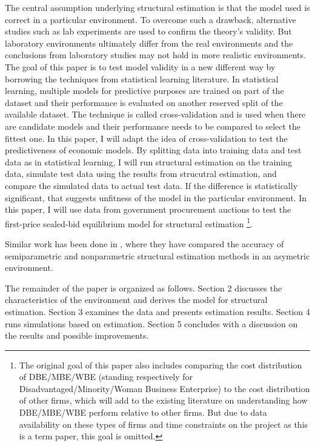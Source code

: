 \documentclass[11pt]{article}
\begin{document}
The central assumption underlying structural estimation is that the model used 
is correct in a particular environment. To overcome such a drawback, alternative 
studies such as lab experiments are used to confirm the theory's validity. But 
laboratory environments ultimately differ from the real environments and 
the conclusions from laboratory studies may not hold in more realistic environments. 
The goal of this paper is to test model validity in a new different way by 
borrowing the techniques from statistical learning literature. In statistical 
learning, multiple models for predictive purposes are trained on part of the dataset 
and their performance is evaluated on another reserved split of 
the available dataset. The technique is called cross-validation 
and is used when there are candidate models and their performance needs to 
be compared to select the fittest one. In this paper, I will adapt the idea 
of cross-validation to test the predictiveness of economic models. By splitting 
data into training data and test data as in statistical learning, I will 
run structural estimation on the training data, simulate test data using the 
results from strucutral estimation, and compare the simulated data to actual 
test data. If the difference is statistically significant, that suggests 
unfitness of the model in the particular environment. 
In this paper, I will use data from government procurement auctions to test 
the first-price sealed-bid equilibrium model \cite{RileySamuelson1981} 
for structural estimation
\footnote{The original goal of this paper also includes comparing the cost 
distribution of DBE/MBE/WBE (standing respectively for Disadvantaged/Minority/Woman
Business Enterprise) to the cost distribution of other firms, which will add 
to the existing literature on understanding how DBE/MBE/WBE perform relative 
to other firms. But due to data availability on these types of firms 
and time constraints on the project as this is a 
term paper, this goal is omitted. }.

Similar work has been done in \citeauthor{ChernomazYushioto2019} 
\citeyear{ChernomazYushioto2019}, where they have compared the accuracy 
of semiparametric and nonparametric structural estimation methods in an 
asymetric environment.  

The remainder of the paper is organized as follows. Section 2 discusses the 
characteristics of the environment and derives the model for structural 
estimation. Section 3 examines the data and presents estimation results. 
Section 4 runs simulations based on estimation. Section 5 concludes with 
a discussion on the results and possible improvements. 
\end{document}

